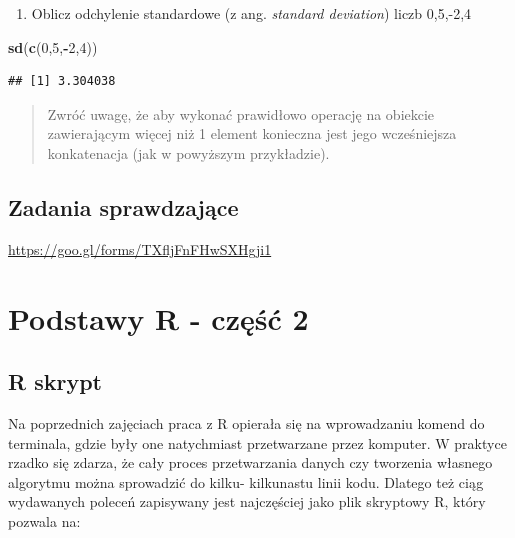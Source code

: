 \documentclass[]{book}
\newenvironment{Shaded}{\begin{snugshade}}{\end{snugshade}}
\newcommand{\KeywordTok}[1]{\textcolor[rgb]{0.13,0.29,0.53}{\textbf{#1}}}
\newcommand{\DecValTok}[1]{\textcolor[rgb]{0.00,0.00,0.81}{#1}}
\newcommand{\OperatorTok}[1]{\textcolor[rgb]{0.81,0.36,0.00}{\textbf{#1}}}
\newcommand{\NormalTok}[1]{#1}
\providecommand{\tightlist}{%
  \setlength{\itemsep}{0pt}\setlength{\parskip}{0pt}}
\theoremstyle{definition}
\theoremstyle{definition}
\theoremstyle{definition}
\theoremstyle{remark}
\begin{document}
\begin{enumerate}
\def\labelenumi{\arabic{enumi}.}
\setcounter{enumi}{3}
\tightlist
\item
  Oblicz odchylenie standardowe (z ang. \emph{standard deviation}) liczb
  0,5,-2,4
\end{enumerate}

\begin{Shaded}
\begin{Highlighting}[]
\KeywordTok{sd}\NormalTok{(}\KeywordTok{c}\NormalTok{(}\DecValTok{0}\NormalTok{,}\DecValTok{5}\NormalTok{,}\OperatorTok{-}\DecValTok{2}\NormalTok{,}\DecValTok{4}\NormalTok{))}
\end{Highlighting}
\end{Shaded}

\begin{verbatim}
## [1] 3.304038
\end{verbatim}

\begin{quote}
Zwróć uwagę, że aby wykonać prawidłowo operację na obiekcie zawierającym
więcej niż 1 element konieczna jest jego wcześniejsza konkatenacja (jak
w powyższym przykładzie).
\end{quote}

\section*{Zadania sprawdzające}\label{zadania-sprawdzajace}

\url{https://goo.gl/forms/TXfljFnFHwSXHgji1}

\chapter{\texorpdfstring{Podstawy \textbf{R } - część
2}{Podstawy R  - część 2}}\label{podstawy-r---czesc-2}

\section{R skrypt}\label{r-skrypt}

Na poprzednich zajęciach praca z R opierała się na wprowadzaniu komend
do terminala, gdzie były one natychmiast przetwarzane przez komputer. W
praktyce rzadko się zdarza, że cały proces przetwarzania danych czy
tworzenia własnego algorytmu można sprowadzić do kilku- kilkunastu linii
kodu. Dlatego też ciąg wydawanych poleceń zapisywany jest najczęściej
jako plik skryptowy R, który pozwala na:
\end{document}
